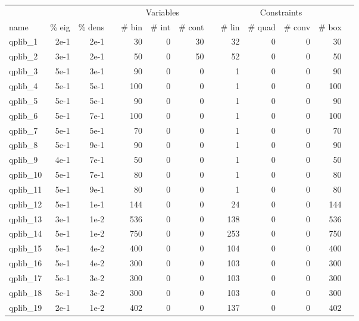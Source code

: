\begin{table}
 \centering
 \setlength{\tabcolsep}{7pt}
 \renewcommand \arraystretch{1}
\begin{tabular}{lrrrrrrrrrrrr}
\toprule

	&		&		&	&	\multicolumn{3}{c}{Variables}					&	&	\multicolumn{4}{c}{Constraints}							\\
\cmidrule(lr){5-7} \cmidrule(lr){9-12}							 														
name	&	\% eig	&	\% dens	&	&	\# bin	&	\# int 	&	\# cont 	&	&	\# lin 	&	\# quad 	&	\# conv 	&	\# box	\\
\cmidrule(lr){5-7} \cmidrule(lr){9-12}																					

qplib\_1	&	2e-1	&	2e-1	&	&	30	&	0	&	30	&	&	32	&	0	&	0	&	30	\\
qplib\_2	&	3e-1	&	2e-1	&	&	50	&	0	&	50	&	&	52	&	0	&	0	&	50	\\
qplib\_3	&	5e-1	&	3e-1	&	&	90	&	0	&	0	&	&	1	&	0	&	0	&	90	\\
qplib\_4	&	5e-1	&	5e-1	&	&	100	&	0	&	0	&	&	1	&	0	&	0	&	100	\\
qplib\_5	&	5e-1	&	5e-1	&	&	90	&	0	&	0	&	&	1	&	0	&	0	&	90	\\
qplib\_6	&	5e-1	&	7e-1	&	&	100	&	0	&	0	&	&	1	&	0	&	0	&	100	\\
qplib\_7	&	5e-1	&	5e-1	&	&	70	&	0	&	0	&	&	1	&	0	&	0	&	70	\\
qplib\_8	&	5e-1	&	9e-1	&	&	90	&	0	&	0	&	&	1	&	0	&	0	&	90	\\
qplib\_9	&	4e-1	&	7e-1	&	&	50	&	0	&	0	&	&	1	&	0	&	0	&	50	\\
qplib\_10	&	5e-1	&	7e-1	&	&	80	&	0	&	0	&	&	1	&	0	&	0	&	80	\\
qplib\_11	&	5e-1	&	9e-1	&	&	80	&	0	&	0	&	&	1	&	0	&	0	&	80	\\
qplib\_12	&	5e-1	&	1e-1	&	&	144	&	0	&	0	&	&	24	&	0	&	0	&	144	\\
qplib\_13	&	3e-1	&	1e-2	&	&	536	&	0	&	0	&	&	138	&	0	&	0	&	536	\\
qplib\_14	&	5e-1	&	1e-2	&	&	750	&	0	&	0	&	&	253	&	0	&	0	&	750	\\
qplib\_15	&	5e-1	&	4e-2	&	&	400	&	0	&	0	&	&	104	&	0	&	0	&	400	\\
qplib\_16	&	5e-1	&	4e-2	&	&	300	&	0	&	0	&	&	103	&	0	&	0	&	300	\\
qplib\_17	&	5e-1	&	3e-2	&	&	300	&	0	&	0	&	&	103	&	0	&	0	&	300	\\
qplib\_18	&	5e-1	&	3e-2	&	&	300	&	0	&	0	&	&	103	&	0	&	0	&	300	\\
qplib\_19	&	2e-1	&	1e-2	&	&	402	&	0	&	0	&	&	137	&	0	&	0	&	402	\\

\end{tabular}
\end{table}
